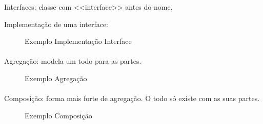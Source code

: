 \documentclass[../resumosLPOO.tex]{subfiles}
\begin{document}
Interfaces: classe com <<interface>> antes do nome. 

Implementação de uma interface:
\begin{figure}[H]
    \centering
    \caption{Exemplo Implementação Interface\label{fig:inheritance}}
\end{figure}

\paragraph{}

Agregação: modela um todo para as partes.
\begin{figure}[H]
    \centering
    \caption{Exemplo Agregação\label{fig:inheritance}}
\end{figure}

\paragraph{}

Composição: forma mais forte de agregação. O todo só existe com as suas partes.
\begin{figure}[H]
    \centering
    \caption{Exemplo Composição\label{fig:inheritance}}
\end{figure}
\end{document}
